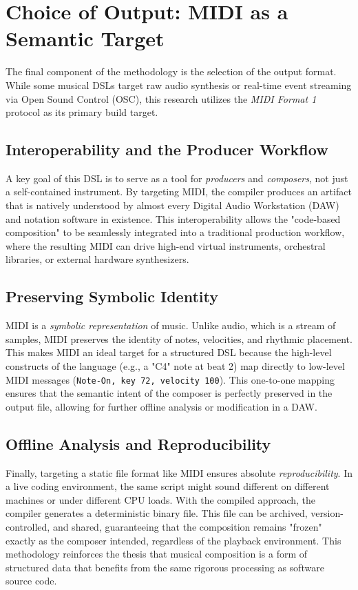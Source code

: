 \section{Choice of Output: MIDI as a Semantic Target}\label{sec:midi-target}

The final component of the methodology is the selection of the output format.
While some musical DSLs target raw audio synthesis or real-time event streaming via Open Sound Control (OSC),
this research utilizes the \textit{MIDI Format 1} protocol as its primary build target.

\subsection{Interoperability and the Producer Workflow}

A key goal of this DSL is to serve as a tool for \textit{producers} and \textit{composers}, not just a
self-contained instrument.
By targeting MIDI, the compiler produces an artifact that is natively understood by almost every Digital
Audio Workstation (DAW) and notation software in existence.
This interoperability allows the "code-based composition" to be seamlessly integrated into a traditional
production workflow, where the resulting MIDI can drive high-end virtual instruments, orchestral libraries,
or external hardware synthesizers.

\subsection{Preserving Symbolic Identity}

MIDI is a \textit{symbolic representation} of music.
Unlike audio, which is a stream of samples, MIDI preserves the identity of notes, velocities, and rhythmic placement.
This makes MIDI an ideal target for a structured DSL because the high-level constructs of the language (e.g.,
a "C4" note at beat 2) map directly to low-level MIDI messages (\texttt{Note-On, key 72, velocity 100}).
This one-to-one mapping ensures that the semantic intent of the composer is perfectly preserved in the output
file, allowing for further offline analysis or modification in a DAW.

\subsection{Offline Analysis and Reproducibility}

Finally, targeting a static file format like MIDI ensures absolute \textit{reproducibility}.
In a live coding environment, the same script might sound different on different machines or under different CPU loads.
With the compiled approach, the compiler generates a deterministic binary file.
This file can be archived, version-controlled, and shared, guaranteeing that the composition remains "frozen"
exactly as the composer intended, regardless of the playback environment.
This methodology reinforces the thesis that musical composition is a form of structured data that benefits
from the same rigorous processing as software source code.
